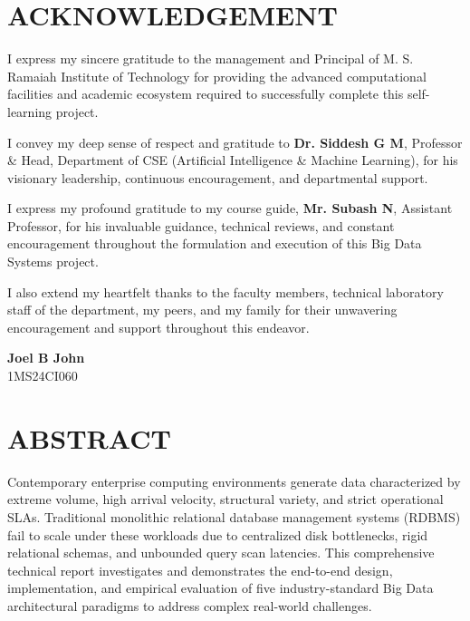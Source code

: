 \documentclass[12pt,a4paper]{report}
\newcommand{\StudentOne}{Joel B John}
\newcommand{\USNOne}{1MS24CI060}
\newcommand{\GuideOne}{Mr. Subash N}
\newcommand{\GuideDesignation}{Assistant Professor}
\newcommand{\HOD}{Dr. Siddesh G M}
\begin{document}
\chapter*{ACKNOWLEDGEMENT}

I express my sincere gratitude to the management and Principal of
M. S. Ramaiah Institute of Technology for providing the advanced computational
facilities and academic ecosystem required to successfully complete this self-learning project.

I convey my deep sense of respect and gratitude to \textbf{\HOD}, Professor \& Head, Department of CSE (Artificial Intelligence \& Machine Learning), for his visionary leadership, continuous encouragement, and departmental support.

I express my profound gratitude to my course guide, \textbf{\GuideOne}, \GuideDesignation, for his invaluable guidance, technical reviews, and constant encouragement throughout the formulation and execution of this Big Data Systems project.

I also extend my heartfelt thanks to the faculty members, technical laboratory staff of the department, my peers, and my family for their unwavering encouragement and support throughout this endeavor.

\vspace{1.5cm}
\begin{flushright}
\textbf{\StudentOne}\\
\USNOne
\end{flushright}

\clearpage

\chapter*{ABSTRACT}

Contemporary enterprise computing environments generate data characterized by extreme volume, high arrival velocity, structural variety, and strict operational SLAs. Traditional monolithic relational database management systems (RDBMS) fail to scale under these workloads due to centralized disk bottlenecks, rigid relational schemas, and unbounded query scan latencies. This comprehensive technical report investigates and demonstrates the end-to-end design, implementation, and empirical evaluation of five industry-standard Big Data architectural paradigms to address complex real-world challenges.
\end{document}
